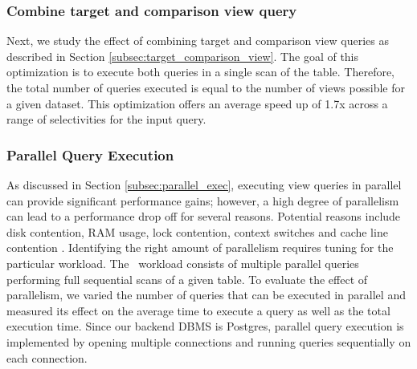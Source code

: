 \subsubsection{Combine target and comparison view query}
Next, we study the effect of combining target and comparison view queries as
described in Section \ref{subsec:target_comparison_view}. The goal of this
optimization is to execute both queries in a single scan of the table.
Therefore, the total number of queries executed is equal to the number of
views possible for a given dataset. This optimization offers an average speed up
of 1.7x across a range of selectivities for the input query.

% 
% 

\subsubsection {Parallel Query Execution}
As discussed in Section \ref{subsec:parallel_exec}, executing view queries in
parallel can provide significant performance gains; however, a high degree of
parallelism can lead to a performance drop off for several reasons. Potential
reasons include disk contention, RAM usage, lock contention, context switches
and cache line contention
\cite{Postgres_wiki}.
Identifying the right amount of parallelism requires tuning for the particular
workload. The \SeeDB\ workload consists of multiple parallel queries performing
full sequential scans of a given table. To evaluate the
effect of parallelism, we varied the number of queries that can be executed in
parallel and measured its effect on the average time to execute a query as well
as the total execution time. Since our backend DBMS is Postgres, parallel query
execution is implemented by opening multiple connections and running queries
sequentially on each connection.

